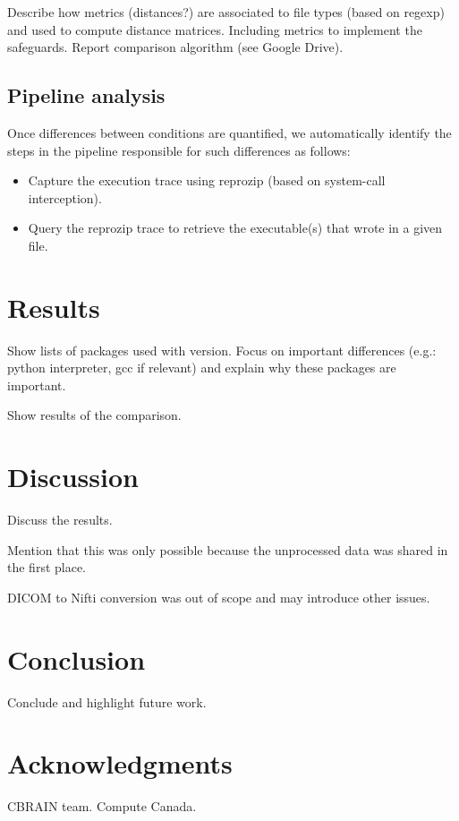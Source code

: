 \documentclass{article}
\begin{document}
Describe how metrics (distances?) are associated to file types (based on regexp) and used to compute distance matrices. Including metrics to implement the safeguards. Report comparison algorithm (see Google Drive).

\subsection{Pipeline analysis}

Once differences between conditions are quantified, we automatically identify the steps in the pipeline responsible for such differences as follows:
\begin{itemize}
\item Capture the execution trace using reprozip (based on system-call interception).
\item Query the reprozip trace to retrieve the executable(s) that wrote in a given file.
\end{itemize}


\section{Results}

Show lists of packages used with version. Focus on important
differences (e.g.: python interpreter, gcc if relevant) and explain
why these packages are important.

Show results of the comparison.

\section{Discussion}

Discuss the results.

Mention that this was only possible because the unprocessed data was shared in the first place.

DICOM to Nifti conversion was out of scope and may introduce other issues.

\section{Conclusion}

Conclude and highlight future work.

\section{Acknowledgments}

CBRAIN team. Compute Canada.



\end{document}
